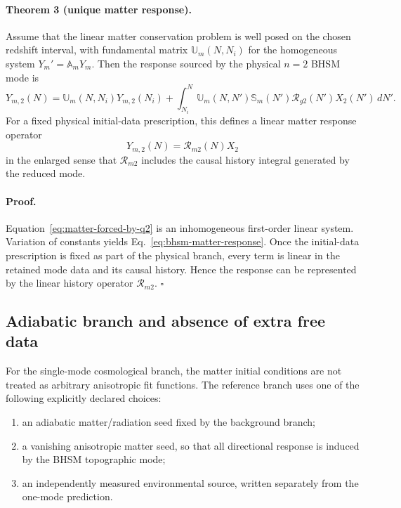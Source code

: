 \paragraph{Theorem 3 (unique matter response).}
Assume that the linear matter conservation problem is well posed on the
chosen redshift interval, with fundamental matrix
$\mathbb U_m(N,N_i)$ for the homogeneous system
$Y_m'=\mathbb A_mY_m$.  Then the response sourced by the physical $n=2$
BHSM mode is
\begin{equation}
\boxed{
Y_{m,2}(N)
=
\mathbb U_m(N,N_i)Y_{m,2}(N_i)
+
\int_{N_i}^{N}
\mathbb U_m(N,N')
\mathbb S_m(N')
\mathcal R_{g2}(N')X_2(N')\,dN' .
}
\label{eq:bhsm-matter-response}
\end{equation}
For a fixed physical initial-data prescription, this defines a linear matter
response operator
\begin{equation}
\boxed{
Y_{m,2}(N)=\mathcal R_{m2}(N)X_2
}
\label{eq:Rm2}
\end{equation}
in the enlarged sense that $\mathcal R_{m2}$ includes the causal history
integral generated by the reduced mode.

\paragraph{Proof.}
Equation~\eqref{eq:matter-forced-by-q2} is an inhomogeneous first-order linear
system.  Variation of constants yields
Eq.~\eqref{eq:bhsm-matter-response}.  Once the initial-data prescription is
fixed as part of the physical branch, every term is linear in the retained
mode data and its causal history.  Hence the response can be represented by
the linear history operator $\mathcal R_{m2}$. \hfill$\square$

\subsection{Adiabatic branch and absence of extra free data}

For the single-mode cosmological branch, the matter initial conditions are
not treated as arbitrary anisotropic fit functions.  The reference branch
uses one of the following explicitly declared choices:

\begin{enumerate}
\item an adiabatic matter/radiation seed fixed by the background branch;
\item a vanishing anisotropic matter seed, so that all directional response is
      induced by the BHSM topographic mode;
\item an independently measured environmental source, written separately from
      the one-mode prediction.
\end{enumerate}

